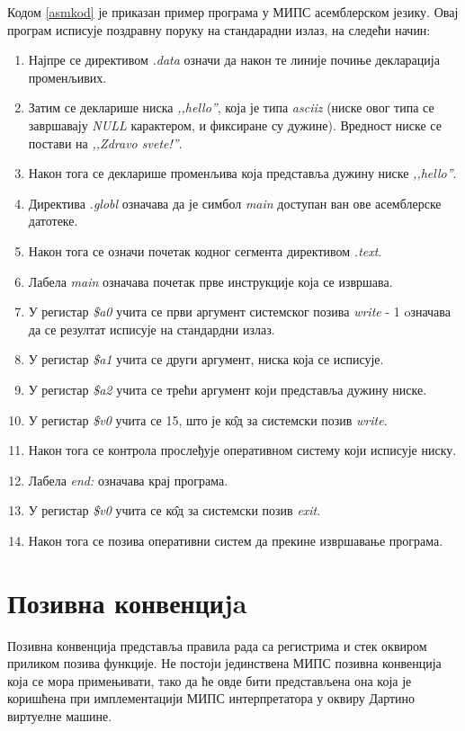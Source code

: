 \documentclass[12pt,oneside]{memoir}
\begin{document}
Кодом \ref{asmkod} је приказан пример програма у МИПС асемблерском језику. Овај програм исписује поздравну поруку на стандарадни излаз, на следећи начин:
\begin{enumerate}
\item Најпре се директивом \textit{.data} означи да након те линије почиње декларација променљивих.
\item Затим се декларише ниска \textit{,,hello''}, која је типа \textit{asciiz} (ниске овог типа се завршавају \textit{NULL} карактером, и фиксиране су дужине). Вредност ниске се постави на \textit{,,Zdravo svete!''}.
\item Након тога се декларише променљива која представља дужину ниске \textit{,,hello''}.
\item Директива \textit{.globl} означава да је симбол \textit{main} доступан ван ове асемблерске датотеке.
\item Након тога се означи почетак кодног сегмента директивом \textit{.text}.
\item Лабела \textit{main} означава почетак прве инструкције која се извршава.
\item У регистар \textit{\$a0} учита се први аргумент системског позива \textit{write} - 1 oзначава да се резултат исписује на стандардни излаз.
\item У регистар \textit{\$a1} учита се други аргумент, ниска која се исписује.
\item У регистар \textit{\$a2} учита се трећи аргумент који представља дужину ниске.
\item У регистар \textit{\$v0} учита се 15, што је к\^{о}д за системски позив \textit{write}.
\item Након тога се контрола прослеђује оперативном систему који исписује ниску.
\item Лабела \textit{ end:} означава крај програма.
\item У регистар \textit{\$v0} учита се к\^{о}д за системски позив \textit{exit}.
\item Након тога се позива оперативни систем да прекине извршавање програма.
\end{enumerate}

\section{Позивна конвенциja}
\label{konvencija}

Позивна конвенција представља правила рада са регистрима и стек оквиром приликом позива функције. Не постоји јединствена МИПС позивна конвенција која се мора примењивати, тако да ће овде бити представљена она која је коришћена при имплементацији МИПС интерпретатора у оквиру Дартино виртуелне машине.
\end{document}
